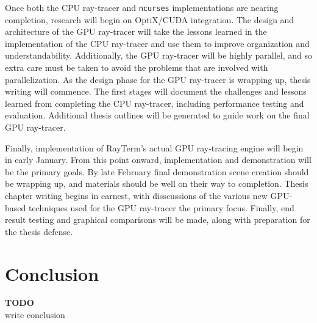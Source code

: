 \documentclass[11pt]{article}
\newcommand{\name}{{\sc RayTerm}}
\newcommand\todo[1]{
\begin{center}
  \color{red}
  {\bf TODO}\\
  #1
\end{center}
}
\begin{document}
Once both the CPU ray-tracer and \texttt{ncurses} implementations are nearing completion, research will begin on OptiX/CUDA integration.
The design and architecture of the GPU ray-tracer will take the lessons learned in the implementation of the CPU ray-tracer and use them to improve organization and understandability.
Additionally, the GPU ray-tracer will be highly parallel, and so extra care must be taken to avoid the problems that are involved with parallelization.
As the design phase for the GPU ray-tracer is wrapping up, thesis writing will commence.
The first stages will document the challenges and lessons learned from completing the CPU ray-tracer, including performance testing and evaluation.
Additional thesis outlines will be generated to guide work on the final GPU ray-tracer.

Finally, implementation of \name's actual GPU ray-tracing engine will begin in early January.
From this point onward, implementation and demonstration will be the primary goals.
By late February final demonstration scene creation should be wrapping up, and materials should be well on their way to completion.
Thesis chapter writing begins in earnest, with disscussions of the various new GPU-based techniques used for the GPU ray-tracer the primary focus.
Finally, end result testing and graphical comparisons will be made, along with preparation for the thesis defense.

\section{Conclusion}
\label{sec:conclusion}


\todo{write conclusion}




\end{document}
